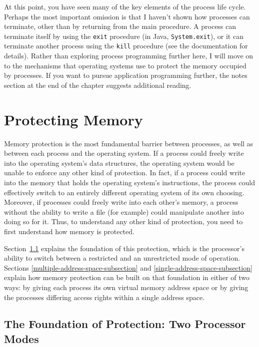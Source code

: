 At this point, you have seen many of the key elements of the
process life cycle.  Perhaps the most important omission is that I
haven't shown how processes can terminate, other than by returning
from the main procedure.  A process can terminate itself by using the
\verb|exit| procedure (in Java,
\verb|System.exit|), or it can
terminate another process using the
\verb|kill| procedure (see the documentation
for details).  Rather than exploring process programming further here,
I will move on to the mechanisms that operating systems use to protect
the memory occupied by processes.  If you want to pursue application programming further, the
notes section at the end of the chapter suggests additional reading.

\section{Protecting Memory}\label{protecting-memory-section}

Memory protection is the most fundamental barrier between processes,
as well as between each process and the operating system.  If a process could
freely write into the operating system's data structures, the
operating system would be unable to enforce any other kind of
protection.  In fact, if a process could write into the memory that holds
the operating system's instructions, the process could effectively
switch to an entirely different operating system of its own choosing.
Moreover, if processes could freely write into each
other's memory, a process without the ability to write a file (for
example) could manipulate another into doing so for it.  Thus, to
understand any other kind of protection, you need to first understand
how memory is protected.

Section~\ref{dual-mode-subsection} explains the foundation of this protection, which is the
processor's ability to switch between a restricted and an unrestricted
mode of operation.  Sections \ref{multiple-address-space-subsection} and \ref{single-address-space-subsection} explain how memory
protection can be built on that foundation in either of two ways: by
giving each process its own virtual memory address space or by giving
the processes differing access rights within a single address space.

\subsection{The Foundation of Protection: Two Processor Modes}\label{dual-mode-subsection}


